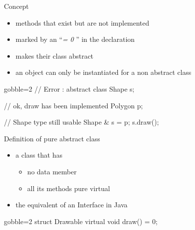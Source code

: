 \begin{frame}[fragile]
  \begin{block}{Concept}
    \begin{itemize}
    \item methods that exist but are not implemented
      \item marked by an ``{\it = 0} '' in the declaration
    \item makes their class abstract
    \item an object can only be instantiated for a non abstract class
    \end{itemize}
  \end{block}
  \pause
  \begin{multicols}{2}
    \begin{cppcode*}{gobble=2}
      // Error : abstract class
      Shape s;

      // ok, draw has been implemented
      Polygon p;
      
      // Shape type still usable
      Shape & s = p;
      s.draw();
    \end{cppcode*}
    \columnbreak
    \center
  \end{multicols}
\end{frame}

\begin{frame}[fragile]
  \begin{block}{Definition of pure abstract class}
    \begin{itemize}
    \item a class that has
      \begin{itemize}
        \item no data member
        \item all its methods pure virtual
      \end{itemize}
    \item the equivalent of an Interface in Java
    \end{itemize}
  \end{block}
  \begin{multicols}{2}
    \begin{cppcode*}{gobble=2}
      struct Drawable {
        virtual void draw() = 0;
      }
    \end{cppcode*}
    \columnbreak
    \center
  \end{multicols}
\end{frame}

